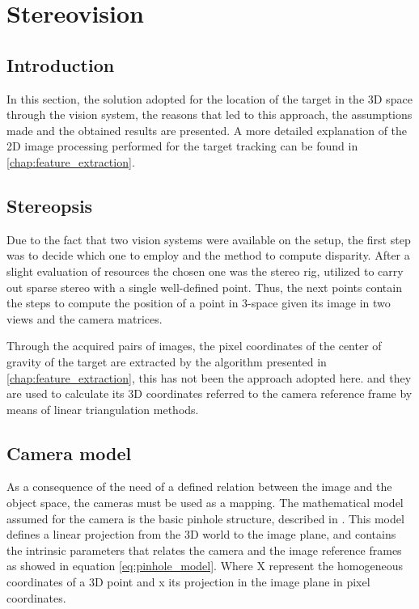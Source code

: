 
\chapter{Stereovision} %
\label{chap:stereopsis}

\section{Introduction}
In this section, the solution adopted for the location of the target in the 3D space through the vision system, the reasons that led to this approach, the assumptions made and the obtained results are presented. 
A more detailed explanation of the 2D image processing performed for the target tracking can be found in \ref{chap:feature_extraction}.

\section{Stereopsis}
Due to the fact that two vision systems were available on the setup, the first step was to decide which one to employ and the method to compute disparity. 
After a slight evaluation of resources the chosen one was the stereo rig, utilized to carry out sparse stereo with a single well-defined point. 
Thus, the next points contain the steps to compute the position of a point in 3-space given its image in two views and the camera matrices. 

Through the acquired pairs of images, the pixel coordinates of the center of gravity of the target are extracted by the algorithm presented in \ref{chap:feature_extraction}, this has not been the approach adopted here.  and they are used to calculate its 3D coordinates referred to the camera reference frame by means of linear triangulation methods.

\section{Camera model}
As a consequence of the need of a defined relation between the image and the object space, the cameras must be used as a mapping. 
The mathematical model assumed for the camera is the basic pinhole structure, described in \cite{Hartley}. 
This model defines a linear projection from the 3D world to the image plane, and contains the intrinsic parameters that relates the camera and the image reference frames as showed in equation \ref{eq:pinhole_model}. Where X represent the homogeneous coordinates of a 3D point and x its projection in the image plane in pixel coordinates.
 
